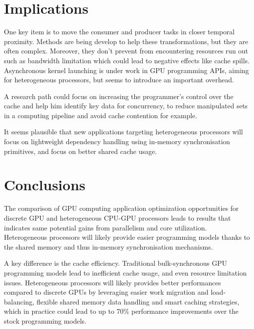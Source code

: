 \documentclass[11pt,twoside,a4paper]{article}
\begin{document}
\begin{multicols}{2}
\section{Implications}

One key item is to move the consumer and producer tasks in closer temporal
proximity. Methods are being develop to help these transformations, but they
are often complex. Moreover, they don't prevent from encountering resources
run out such as bandwidth limitation which could lead to negative effects like
cache spills. Asynchronous kernel launching is under work in GPU programming
APIs, aiming for heterogeneous processors, but seems to introduce an important
overhead.

A research path could focus on increasing the programmer's control over the
cache and help him identify key data for concurrency, to reduce manipulated
sets in a computing pipeline and avoid cache contention for example.

It seems plausible that new applications targeting heterogeneous processors
will focus on lightweight dependency handling using in-memory synchronisation
primitives, and focus on better shared cache usage.

\section{Conclusions}

The comparison of GPU computing application optimization opportunities for
discrete GPU and heterogeneous CPU-GPU processors leads to results that
indicates same potential gains from parallelism and core utilization.
Heterogeneous processors will likely provide easier programming models thanks
to the shared memory and thus in-memory synchronisation mechanisms.

A key difference is the cache efficiency. Traditional bulk-synchronous GPU
programming models lead to inefficient cache usage, and even resource
limitation issues. Heterogeneous processors will likely provides better
performances compared to discrete GPUs by leveraging easier work migration and
load-balancing, flexible shared memory data handling and smart caching
strategies, which in practice could lead to up to 70\% performance improvements
over the stock programming models.

\end{multicols}
\end{document}
